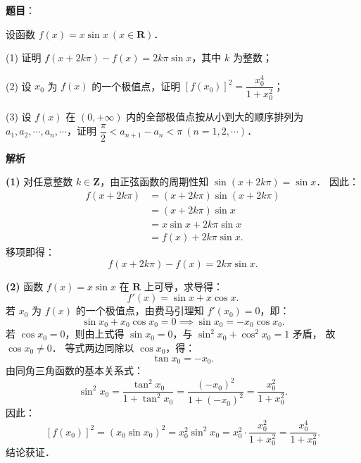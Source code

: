 \begin{answer}

\textbf{题目}：

设函数 $f(x) = x \sin x\ (x \in \mathbf{R})$．

(1) 证明 $f(x + 2k\pi) - f(x) = 2k\pi \sin x$，其中 $k$ 为整数；

(2) 设 $x_0$ 为 $f(x)$ 的一个极值点，证明 $[f(x_0)]^2 = \dfrac{x_0^4}{1 + x_0^2}$；

(3) 设 $f(x)$ 在 $(0, +\infty)$ 内的全部极值点按从小到大的顺序排列为 $a_1, a_2, \cdots, a_n, \cdots$，证明 $\dfrac{\pi}{2} < a_{n+1} - a_n < \pi\ (n = 1, 2, \cdots)$．

\textbf{解析}

\textbf{(1)}
对任意整数 $k \in \mathbf{Z}$，由正弦函数的周期性知 $\sin(x + 2k\pi) = \sin x$．
因此：
\nopagebreak[4]
\[
\begin{aligned}
f(x + 2k\pi) &= (x + 2k\pi) \sin(x + 2k\pi) \\
&= (x + 2k\pi) \sin x \\
&= x \sin x + 2k\pi \sin x \\
&= f(x) + 2k\pi \sin x.
\end{aligned}
\]
移项即得：
\nopagebreak[4]
\[
f(x + 2k\pi) - f(x) = 2k\pi \sin x.
\]

\textbf{(2)}
函数 $f(x) = x \sin x$ 在 $\mathbf{R}$ 上可导，求导得：
\nopagebreak[4]
\[
f'(x) = \sin x + x \cos x.
\]
若 $x_0$ 为 $f(x)$ 的一个极值点，由费马引理知 $f'(x_0) = 0$，即：
\nopagebreak[4]
\[
\sin x_0 + x_0 \cos x_0 = 0 \implies \sin x_0 = -x_0 \cos x_0.
\]
若 $\cos x_0 = 0$，则由上式得 $\sin x_0 = 0$，与 $\sin^2 x_0 + \cos^2 x_0 = 1$ 矛盾，
故 $\cos x_0 \neq 0$．
等式两边同除以 $\cos x_0$，得：
\nopagebreak[4]
\[
\tan x_0 = -x_0.
\]
由同角三角函数的基本关系式：
\nopagebreak[4]
\[
\sin^2 x_0 = \dfrac{\tan^2 x_0}{1 + \tan^2 x_0} = \dfrac{(-x_0)^2}{1 + (-x_0)^2} = \dfrac{x_0^2}{1 + x_0^2}.
\]
因此：
\nopagebreak[4]
\[
[f(x_0)]^2 = (x_0 \sin x_0)^2 = x_0^2 \sin^2 x_0 = x_0^2 \cdot \dfrac{x_0^2}{1 + x_0^2} = \dfrac{x_0^4}{1 + x_0^2}.
\]
结论获证．


\end{answer}
